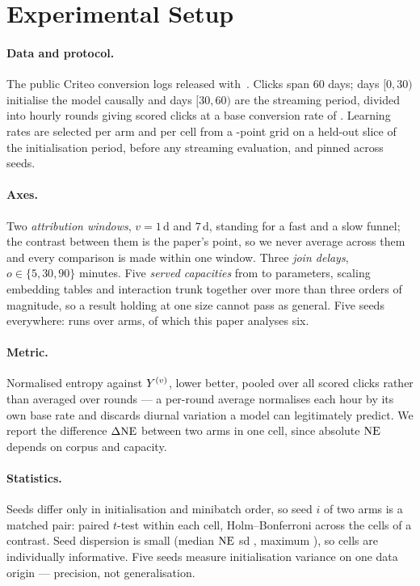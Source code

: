 \section{Experimental Setup}
\label{sec:setup}

\paragraph{Data and protocol.} The public Criteo conversion logs released
with~\cite{chapelle2014modeling}. Clicks span 60 days; days $[0,30)$ initialise the model
causally and days $[30,60)$ are the streaming period, divided into \nCohorts{} hourly rounds
giving \nEval{} scored clicks at a base conversion rate of \baseRate{}. Learning rates are
selected per arm and per cell from a \nLr{}-point grid on a held-out slice of the initialisation
period, before any streaming evaluation, and pinned across seeds.

\paragraph{Axes.} Two \emph{attribution windows}, $v=1$\,d and $7$\,d, standing for a fast and a
slow funnel; the contrast between them is the paper's point, so we never average across them and
every comparison is made within one window. Three \emph{join delays}, $o\in\{5,30,90\}$ minutes. Five \emph{served capacities} from
\capMin{} to \capMax{} parameters, scaling embedding tables and interaction trunk together over
more than three orders of magnitude, so a result holding at one size cannot pass as general.
Five seeds everywhere: \nRuns{} runs over \nArms{} arms, of which this paper analyses six.

\paragraph{Metric.} Normalised entropy against $Y^{(v)}$, lower better, pooled over all scored
clicks rather than averaged over rounds --- a per-round average normalises each hour by its own
base rate and discards diurnal variation a model can legitimately predict. We report the
difference $\Delta\mathrm{NE}$ between two arms in one cell, since absolute $\mathrm{NE}$ depends on corpus and
capacity.

\paragraph{Statistics.} Seeds differ only in initialisation and minibatch order, so seed $i$
of two arms is a matched pair: paired $t$-test within each cell, Holm--Bonferroni across the
\nContrast{} cells of a contrast. Seed dispersion is small (median $\mathrm{NE}$ sd \seedSdMed{},
maximum \seedSdMax{}), so cells are individually informative. Five seeds measure initialisation
variance on one data origin --- precision, not generalisation.
